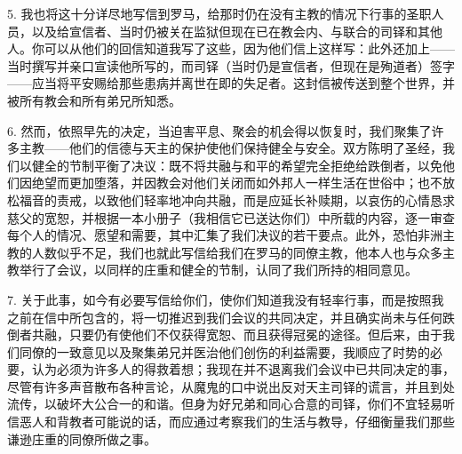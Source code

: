 5. 我也将这十分详尽地写信到罗马，给那时仍在没有主教的情况下行事的圣职人员，以及给宣信者、当时仍被关在监狱但现在已在教会内、与联合的司铎和其他人。你可以从他们的回信知道我写了这些，因为他们信上这样写：此外还加上——当时撰写并亲口宣读他所写的，而司铎（当时仍是宣信者，但现在是殉道者）签字——应当将平安赐给那些患病并离世在即的失足者。这封信被传送到整个世界，并被所有教会和所有弟兄所知悉。\par

6. 然而，依照早先的决定，当迫害平息、聚会的机会得以恢复时，我们聚集了许多主教——他们的信德与天主的保护使他们保持健全与安全。双方陈明了圣经，我们以健全的节制平衡了决议：既不将共融与和平的希望完全拒绝给跌倒者，以免他们因绝望而更加堕落，并因教会对他们关闭而如外邦人一样生活在世俗中；也不放松福音的责戒，以致他们轻率地冲向共融，而是应延长补赎期，以哀伤的心情恳求慈父的宽恕，并根据一本小册子（我相信它已送达你们）中所载的内容，逐一审查每个人的情况、愿望和需要，其中汇集了我们决议的若干要点。此外，恐怕非洲主教的人数似乎不足，我们也就此写信给我们在罗马的同僚主教，他本人也与众多主教举行了会议，以同样的庄重和健全的节制，认同了我们所持的相同意见。\par

7. 关于此事，如今有必要写信给你们，使你们知道我没有轻率行事，而是按照我之前在信中所包含的，将一切推迟到我们会议的共同决定，并且确实尚未与任何跌倒者共融，只要仍有使他们不仅获得宽恕、而且获得冠冕的途径。但后来，由于我们同僚的一致意见以及聚集弟兄并医治他们创伤的利益需要，我顺应了时势的必要，认为必须为许多人的得救着想；我现在并不退离我们会议中已共同决定的事，尽管有许多声音散布各种言论，从魔鬼的口中说出反对天主司铎的谎言，并且到处流传，以破坏大公合一的和谐。但身为好兄弟和同心合意的司铎，你们不宜轻易听信恶人和背教者可能说的话，而应通过考察我们的生活与教导，仔细衡量我们那些谦逊庄重的同僚所做之事。\par

